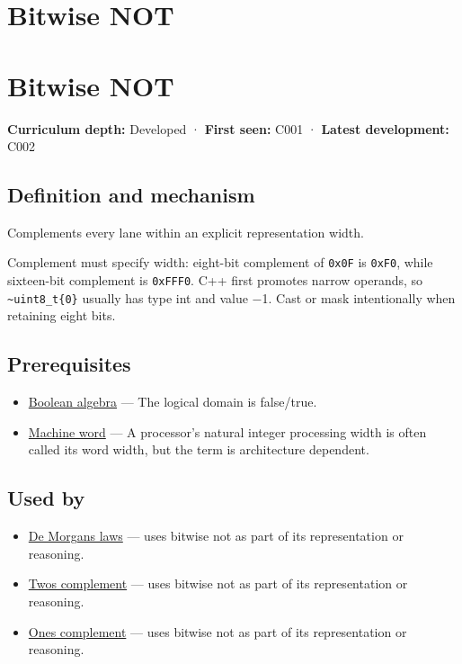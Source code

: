 \hypertarget{appendix-8f38927cfc54}{}
\section*{Bitwise NOT}
\section{Bitwise NOT}\label{bitwise-not}

\textbf{Curriculum depth:} Developed · \textbf{First seen:} C001 · \textbf{Latest development:} C002

\subsection{Definition and mechanism}\label{definition-and-mechanism}

Complements every lane within an explicit representation width.

Complement must specify width: eight-bit complement of \texttt{0x0F} is \texttt{0xF0}, while sixteen-bit complement is \texttt{0xFFF0}. C++ first promotes narrow operands, so \texttt{\textasciitilde{}uint8\_t\{0\}} usually has type int and value −1. Cast or mask intentionally when retaining eight bits.

\subsection{Prerequisites}\label{prerequisites}

\begin{itemize}
\tightlist
\item
  \hyperref[appendix-24475e1596a8]{Boolean algebra} --- The logical domain is false/true.
\item
  \hyperref[appendix-d67a19507dc5]{Machine word} --- A processor's natural integer processing width is often called its word width, but the term is architecture dependent.
\end{itemize}

\subsection{Used by}\label{used-by}

\begin{itemize}
\tightlist
\item
  \hyperref[appendix-9079d3659da4]{De Morgan\textquotesingle s laws} --- uses bitwise not as part of its representation or reasoning.
\item
  \hyperref[appendix-4fbc03d20829]{Two\textquotesingle s complement} --- uses bitwise not as part of its representation or reasoning.
\item
  \hyperref[appendix-03c678cd40b3]{One\textquotesingle s complement} --- uses bitwise not as part of its representation or reasoning.
\end{itemize}

